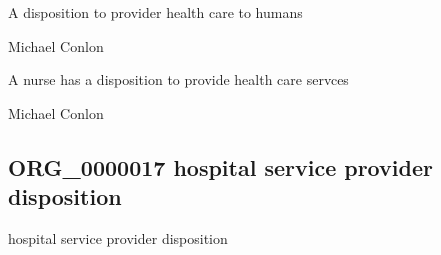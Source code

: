 \documentclass[letterpaper,10pt,english]{sphinxmanual}
\begin{document}
\begin{sphinxShadowBox}

\sphinxAtStartPar
{\hyperref[\detokenize{doc-ORG_0000010::doc}]{}}
\end{sphinxShadowBox}

\begin{sphinxShadowBox}

\sphinxAtStartPar
A disposition to provider health care to humans
\end{sphinxShadowBox}

\begin{sphinxShadowBox}

\sphinxAtStartPar
Michael Conlon 
\end{sphinxShadowBox}

\begin{sphinxShadowBox}

\sphinxAtStartPar
A nurse has a disposition to provide health care servces
\end{sphinxShadowBox}

\begin{sphinxShadowBox}

\sphinxAtStartPar
Michael Conlon 
\end{sphinxShadowBox}
\begin{quote}

\ignorespaces \end{quote}


\subsection{ORG\_0000017 \sphinxhyphen{} hospital service provider disposition}
\label{\detokenize{doc-ORG_0000017:org-0000017-hospital-service-provider-disposition}}\label{\detokenize{doc-ORG_0000017:index-0}}\label{\detokenize{doc-ORG_0000017::doc}}
\begin{sphinxShadowBox}

\sphinxAtStartPar
hospital service provider disposition
\end{sphinxShadowBox}
\end{document}
